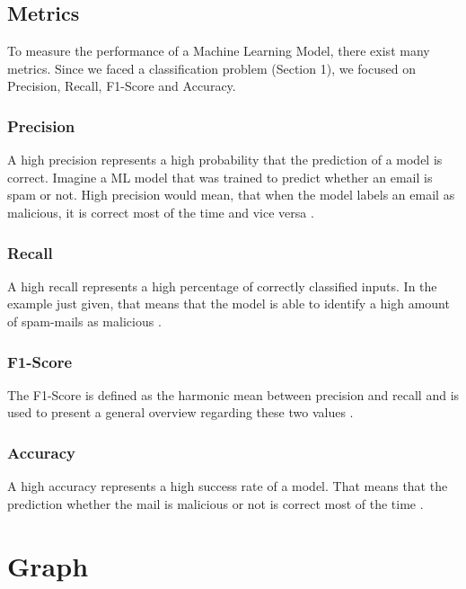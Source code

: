 	
		\subsection{Metrics}
	
			To measure the performance of a Machine Learning Model, there exist many metrics. Since we faced a classification problem (Section 1), we focused on Precision, Recall, F1-Score and Accuracy.
		
			\subsubsection{Precision}
				
				A high precision represents a high probability that the prediction of a model is correct. Imagine a ML model that was trained to predict whether an email is spam or not. High precision would mean, that when the model labels an email as malicious, it is correct most of the time and vice versa .
				
			\subsubsection{Recall}
			
				A high recall represents a high percentage of correctly classified inputs. In the example just given, that means that the model is able to identify a high amount of spam-mails as malicious .
				
			\subsubsection{F1-Score}
			
				The F1-Score is defined as the harmonic mean between precision and recall and is used to present a general overview regarding these two values .
				
			\subsubsection{Accuracy}
			
				A high accuracy represents a high success rate of a model. That means that the prediction whether the mail is malicious or not is correct most of the time .
	
	\section{Graph}
		
